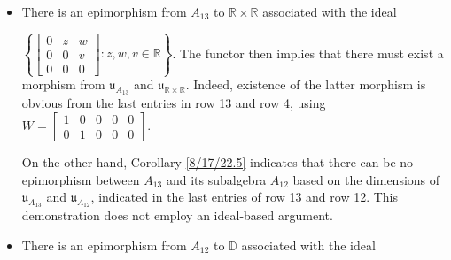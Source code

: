 \documentclass{amsart}
\numberwithin{equation}{section}
\theoremstyle{definition}
\numberwithin{theorem}{section}
\begin{document}
\begin{itemize}
\item There is an epimorphism from $A_{13}$ to $\mathbb{R}\times\mathbb{R}$ associated with the ideal

 $\left\{\left[\begin{array}{ccc}
0  & z & w   \\
 0 & 0 & v \\
 0 & 0 & 0    
\end{array}\right]:z,w,v\in\mathbb{R}\right\}$. The functor then implies that there must exist a morphism from $\mathfrak{u}_{A_{13}}$ and $\mathfrak{u}_{\mathbb{R}\times\mathbb{R}}$.  Indeed, existence of the latter morphism is obvious from the last entries in row 13 and row 4, using $W = \left[\begin{array}{ccccc}
 1 & 0 & 0 & 0 & 0 \\ 
 0 & 1 & 0 & 0 & 0 
\end{array}\right]$.  

On the other hand, Corollary \ref{8/17/22.5} indicates that there can be no epimorphism between $A_{13}$ and its subalgebra $A_{12}$ based on the dimensions of $\mathfrak{u}_{A_{13}}$ and $\mathfrak{u}_{A_{12}}$, indicated in the last entries of row 13 and row 12.  This demonstration does not employ an ideal-based argument.
\item 
There is an epimorphism from $A_{12}$ to  $\mathbb{D}$ associated with the ideal


\end{itemize}
\end{document}
